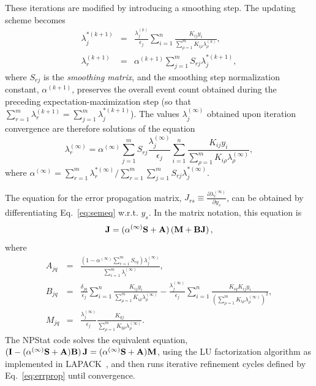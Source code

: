 \documentclass[12pt,titlepage]{article}
\begin{document}
These iterations are modified by introducing a smoothing step. The updating
scheme becomes
\begin{eqnarray}
    \lambda_j^{*(k+1)} & = & \frac{\lambda_j^{(k)}}{\epsilon_j} \sum_{i=1}^{n} \frac{K_{ij} y_i}{\sum_{\rho=1}^{m} K_{i\rho} \lambda_{\rho}^{(k)}}, \\
    \lambda_r^{(k+1)} & = & \alpha^{(k+1)} \sum_{j=1}^m S_{r j} \lambda_j^{*(k+1)},
\label{eq:semscheme}
\end{eqnarray}
where $S_{r j}$ is the {\it smoothing matrix}, and
the smoothing step normalization constant, $\alpha^{(k+1)}$, preserves the
overall event count obtained during the preceding expectation-maximization
step (so that $\sum_{r=1}^m \lambda_r^{(k+1)} = \sum_{j=1}^m \lambda_j^{*(k+1)}$). The values $\lambda_j^{(\infty)}$ 
obtained upon iteration convergence are therefore solutions of the equation
\begin{equation}
    \lambda_r^{(\infty)} = \alpha^{(\infty)} \sum_{j=1}^m S_{r j} \frac{\lambda_j^{(\infty)}}{\epsilon_j} \sum_{i=1}^{n} \frac{K_{ij} y_i}{\sum_{\rho=1}^{m} K_{i\rho} \lambda_{\rho}^{(\infty)}},
\label{eq:semeq}
\end{equation}
where $\alpha^{(\infty)} = \sum_{r=1}^m \lambda_r^{*(\infty)} / \sum_{r=1}^m \sum_{j=1}^m S_{r j} \lambda_j^{*(\infty)}$.

The equation for the error propagation matrix,
$J_{rs} \equiv \frac{\partial \lambda_r^{(\infty)}}{\partial y_s}$, can be obtained
by differentiating Eq.~\ref{eq:semeq} w.r.t. $y_s$. In the matrix notation, this
equation is
\begin{equation}
{\bf J} = (\alpha^{(\infty)} {\bf S} + {\bf A}) \left({\bf M} + {\bf B J}\right),
\label{eq:errprop}
\end{equation}
where
\begin{eqnarray}
    A_{j q} & = & \frac{\left(1 - \alpha^{(\infty)} \sum_{r=1}^m S_{rq} \right) \lambda_j^{(\infty)}}{\sum_{i=1}^{m} \lambda_i^{(\infty)}}, \label{eq:errpropmatricesa} \\
    B_{j q} & = & \frac{\delta_{j q}}{\epsilon_j} \sum_{i=1}^{n} \frac{K_{ij } y_i}{\sum_{\rho=1}^{m} K_{i\rho} \lambda_{\rho}^{(\infty)}} -  \frac{\lambda_j^{(\infty)}}{\epsilon_j} \sum_{i=1}^{n} \frac{K_{iq} K_{ij} y_i}{\left(\sum_{\rho=1}^{m} K_{i\rho} \lambda_{\rho}^{(\infty)}\right)^2},\\
    M_{j q} & = & \frac{\lambda_j^{(\infty)}}{\epsilon_j} \frac{K_{q j }}{\sum_{\rho=1}^{m} K_{q\rho} \lambda_{\rho}^{(\infty)}}.
\end{eqnarray}
The NPStat code solves the equivalent equation, $({\bf I} - (\alpha^{(\infty)} {\bf S} + {\bf A}) {\bf B}) \, {\bf J} = (\alpha^{(\infty)} {\bf S} + {\bf A}) {\bf M}$, using the LU
factorization algorithm as implemented in LAPACK~\cite{ref:lapack}, and then
runs iterative refinement cycles defined by Eq.~\ref{eq:errprop}
until convergence.
\end{document}
